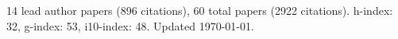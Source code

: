 14 lead author papers (896 citations),
60 total papers (2922 citations).\newline
h-index: 32, g-index: 53, i10-index: 48. Updated \today.